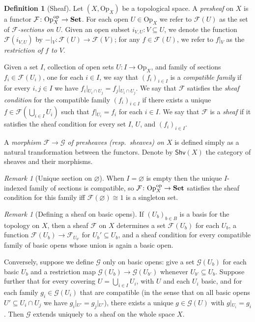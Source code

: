 \documentclass[11pt, oneside, article]{memoir}
\theoremstyle{plain}
\theoremstyle{definition}
\newtheorem{definition}[theorem]{Definition}
\theoremstyle{remark}
\newtheorem{remark}[theorem]{Remark}
\renewcommand{\ss}{\subseteq}
\newcommand{\Set}[1]{\mathrm{#1}}
\newcommand{\cat}[1]{\mathcal{#1}}
\newcommand{\Cat}[1]{\mathbf{#1}}
\newcommand{\fun}[1]{\mathcal{#1}}
\newcommand{\Fun}[1]{\mathsf{#1}}
\newcommand{\sheaf}[1]{\fun{#1}}
\newcommand{\smset}{\Cat{Set}}
\newcommand{\tn}[1]{\textnormal{#1}}
\newcommand{\shv}{\Fun{Shv}}
\newcommand{\Op}{\Set{Op}}
\newcommand{\op}{^\tn{op}}
\newcommand{\rest}[2]{#1\big|\hspace{0in}_{#2}}
\begin{document}
\begin{definition}[Sheaf]\label{def.sheaf}
Let $(X,\Op_X)$ be a topological space. A \emph{presheaf} on $X$ is a functor $\sheaf{F}\colon\Op_X\op\to\smset$. For each open $U\in\Op_X$ we refer to $\sheaf{F}(U)$ as the set of \emph{$\sheaf{F}$-sections on $U$}. Given an open subset $i_{V,U}\colon V\ss U$, we denote the function $\sheaf{F}(i_{V,U})$ by $\rest{-}{V}\colon\sheaf{F}(U)\to\sheaf{F}(V)$; for any $f\in\sheaf{F}(U)$, we refer to $\rest{f}{V}$ as the \emph{restriction of $f$ to $V$}.

Given a set $I$, collection of open sets $U\colon I\to\Op_X$, and family of sections $f_i\in\sheaf{F}(U_i)$, one for each $i\in I$, we say that $(f_i)_{i\in I}$ is a \emph{compatible family} if for every $i,j\in I$ we have $\rest{f_i}{U_i\cap U_j}=\rest{f_j}{U_i\cap U_j}$. We say that $\sheaf{F}$ satisfies the \emph{sheaf condition} for the compatible family $(f_i)_{i\in I}$ if there exists a unique $f\in \sheaf{F}(\bigcup_{i\in I}U_i)$ such that $\rest{f}{U_i}=f_i$ for each $i\in I$. We say that $\sheaf{F}$ is a \emph{sheaf} if it satisfies the sheaf condition for every set $I$, $U$, and $(f_i)_{i\in I}$.

A \emph{morphism $\sheaf{F}\to\sheaf{G}$ of presheaves (resp.\ sheaves) on $X$} is defined simply as a natural transformation between the functors. Denote by $\shv(X)$ the category of sheaves and their morphisms.
\end{definition}

\begin{remark}[Unique section on $\varnothing$]\label{rem.unique_sec_empty}
When $I=\varnothing$ is empty then the unique $I$-indexed family of sections is compatible, so $\cat{F}\colon\Op_X\op\to\smset$ satisfies the sheaf condition for this family iff $\sheaf{F}(\varnothing)\cong 1$ is a singleton set.
\end{remark}

\begin{remark}[Defining a sheaf on basic opens]
If $(U_b)_{b\in B}$ is a basis for the topology on $X$, then a sheaf $\sheaf{F}$ on $X$ determines a set $\sheaf{F}(U_b)$ for each $U_b$, a function $\sheaf{F}(U_b)\to\sheaf{F}_{U_{b'}}$ for $U_b'\ss U_b$, and a sheaf condition for every compatible family of basic opens whose union is again a basic open. 

Conversely, suppose we define $\sheaf{G}$ only on basic opens: give a set $\sheaf{G}(U_b)$ for each basic $U_b$ and a restriction map $\sheaf{G}(U_b)\to\sheaf{G}(U_{b'})$ whenever $U_{b'}\ss U_b$. Suppose further that for every covering $U=\bigcup_{i\in I}U_i$, with $U$ and each $U_i$ basic, and for each family $g_i\in\sheaf{G}(U_i)$ that are compatible (in the sense that on all basic opens $U'\ss U_i\cap U_j$ we have $\rest{g_i}{U'}=\rest{g_j}{U'}$), there exists a unique $g\in \sheaf{G}(U)$ with $\rest{g}{U_i}=g_i$. Then $\sheaf{G}$ extends uniquely to a sheaf on the whole space $X$.
\end{remark}
\end{document}
